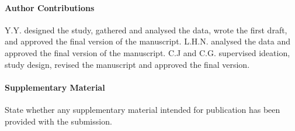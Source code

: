 \documentclass{CUP-JNL-DAP}%
\begin{document}
\begin{Backmatter}
\paragraph{Author Contributions}
Y.Y. designed the study, gathered and analysed the data, wrote the first draft, and approved the final version of the manuscript. L.H.N. analysed the data and approved the final version of the manuscript. C.J and C.G. supervised ideation, study design, revised the manuscript and approved the final version. 

\paragraph{Supplementary Material}
State whether any supplementary material intended for publication has been provided with the submission.


% 



\end{Backmatter}
\end{document}
